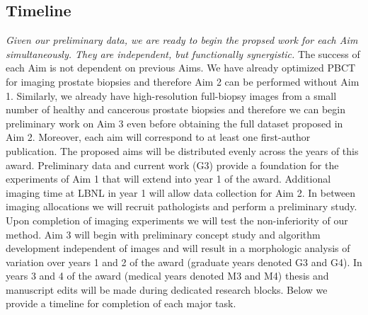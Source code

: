 \documentclass{NIHGrant}
\theoremstyle{theorem}
\begin{document}
\subsection*{Timeline}
%
\emph{Given our preliminary data, we are ready to begin the propsed work for each Aim simultaneously. They are independent, but functionally synergistic.} The success of each Aim is not dependent on previous Aims. We have already optimized PBCT for imaging prostate biopsies and therefore Aim 2 can be performed without Aim 1. Similarly, we already have high-resolution full-biopsy images from a small number of healthy and cancerous prostate biopsies and therefore we can begin preliminary work on Aim 3 even before obtaining the full dataset proposed in Aim 2. Moreover, each aim will correspond to at least one first-author publication. The proposed aims will be distributed evenly across the years of this award. Preliminary data and current work (G3) provide a foundation for the experiments of Aim 1 that will extend into year 1 of the award. Additional imaging time at LBNL in year 1 will allow data collection for Aim 2. In between imaging allocations we will recruit pathologists and perform a preliminary study. Upon completion of imaging experiments we will test the non-inferiority of our method. Aim 3 will begin with preliminary concept study and algorithm development independent of images and will result in a morphologic analysis of variation over years 1 and 2 of the award (graduate years denoted G3 and G4). In years 3 and 4 of the award (medical years denoted M3 and M4) thesis and manuscript edits will be made during dedicated research blocks. Below we provide a timeline for completion of each major task.
\end{document}
